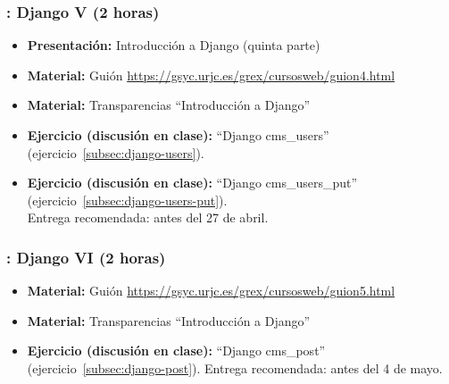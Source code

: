 \documentclass[a4paper,12pt]{article}
\begin{document}
\subsubsection{\lunesJ: Django V (2 horas)}
\label{cal:lunesJ}

\begin{itemize}
 \item \textbf{Presentación:} Introducción a Django (quinta parte)
 \item \textbf{Material:} Guión \url{https://gsyc.urjc.es/grex/cursosweb/guion4.html}
 \item \textbf{Material:} Transparencias ``Introducción a Django''
 \item \textbf{Ejercicio (discusión en clase):} ``Django cms\_users'' (ejercicio~\ref{subsec:django-users}).
 \item \textbf{Ejercicio (discusión en clase):} ``Django cms\_users\_put'' (ejercicio~\ref{subsec:django-users-put}). \\
  Entrega recomendada: antes del 27 de abril.
\end{itemize}

\subsubsection{\lunesK: Django VI (2 horas)}
\label{cal:lunesK}

\begin{itemize}

 \item \textbf{Material:} Guión \url{https://gsyc.urjc.es/grex/cursosweb/guion5.html}
 \item \textbf{Material:} Transparencias ``Introducción a Django''
 \item \textbf{Ejercicio (discusión en clase):} ``Django cms\_post'' (ejercicio~\ref{subsec:django-post}).
  Entrega recomendada: antes del 4 de mayo.
\end{itemize}
\end{document}
